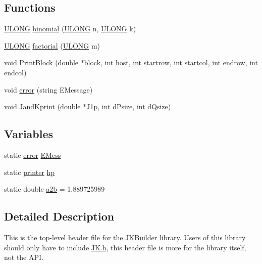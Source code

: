 \subsection*{Functions}
\begin{DoxyCompactItemize}
\item 
\hyperlink{namespaceJKBuilder_af632da489ebc3708ec3ab6791ee53fa4}{ULONG} \hyperlink{namespaceJKBuilder_aa1788c8c311e8c98d9db3c6b8094570c}{binomial} (\hyperlink{namespaceJKBuilder_af632da489ebc3708ec3ab6791ee53fa4}{ULONG} n, \hyperlink{namespaceJKBuilder_af632da489ebc3708ec3ab6791ee53fa4}{ULONG} k)
\item 
\hyperlink{namespaceJKBuilder_af632da489ebc3708ec3ab6791ee53fa4}{ULONG} \hyperlink{namespaceJKBuilder_a0abd753c6677358f15ae5ef2bc41dd4f}{factorial} (\hyperlink{namespaceJKBuilder_af632da489ebc3708ec3ab6791ee53fa4}{ULONG} m)
\item 
void \hyperlink{namespaceJKBuilder_aafc94332505e33cee00dd5ace182d2ee}{PrintBlock} (double $\ast$block, int host, int startrow, int startcol, int endrow, int endcol)
\item 
void \hyperlink{namespaceJKBuilder_a6935fce10a29a2d7c6ebcdb26fded20f}{error} (string EMessage)
\item 
void \hyperlink{namespaceJKBuilder_afeb5f113e0e9c0ed41051e80f2f92271}{JandKprint} (double $\ast$J1p, int dPsize, int dQsize)
\end{DoxyCompactItemize}
\subsection*{Variables}
\begin{DoxyCompactItemize}
\item 
static \hyperlink{classJKBuilder_1_1error}{error} \hyperlink{namespaceJKBuilder_aad24947c8da52c249281295b850dec83}{EMess}
\item 
static \hyperlink{classJKBuilder_1_1printer}{printer} \hyperlink{namespaceJKBuilder_a7ee4aa020c4d01e7c8355be5805e47a9}{hp}
\item 
static double \hyperlink{namespaceJKBuilder_a37aaee68153498610114658cc91dab66}{a2b} = 1.889725989
\end{DoxyCompactItemize}


\subsection{Detailed Description}
This is the top-\/level header file for the \hyperlink{namespaceJKBuilder}{JKBuilder} library. Users of this library should only have to include \hyperlink{JK_8h}{JK.h}, this header file is more for the library itself, not the API. 

